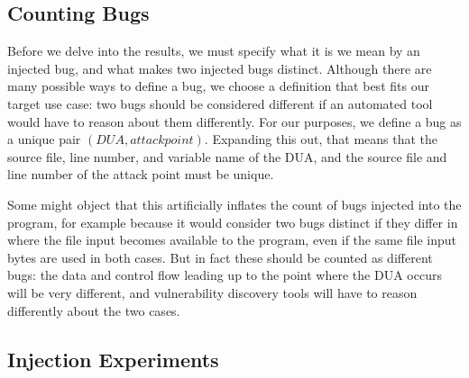 \subsection*{Counting Bugs}

Before we delve into the results, we must specify what it is we mean by an injected bug, and what makes two injected bugs distinct. Although there are many possible ways to define a bug, we choose a definition that best fits our target use case: two bugs should be considered different if an automated tool would have to reason about them differently. For our purposes, we define a bug as a unique pair $(DUA, attack point)$. Expanding this out, that means that the source file, line number, and variable name of the DUA, and the source file and line number of the attack point must be unique.

Some might object that this artificially inflates the count of bugs injected into the program, for example because it would consider two bugs distinct if they differ in where the file input becomes available to the program, even if the same file input bytes are used in both cases. But in fact these should be counted as different bugs: the data and control flow leading up to the point where the DUA occurs will be very different, and vulnerability discovery tools will have to reason differently about the two cases.

\subsection{Injection Experiments}
\label{sec:results:subsec:injection}

